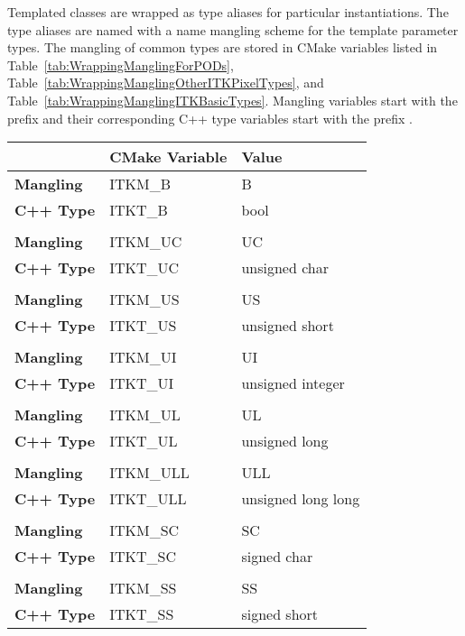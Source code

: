 Templated classes are wrapped as type aliases for particular instantiations. The
type aliases are named with a name mangling scheme for the template parameter
types. The mangling of common types are stored in CMake variables listed in
Table~\ref{tab:WrappingManglingForPODs},
Table~\ref{tab:WrappingManglingOtherITKPixelTypes}, and
Table~\ref{tab:WrappingManglingITKBasicTypes}. Mangling variables start with the prefix
 and their corresponding C++ type variables start with the
prefix .

\begin{table}
\begin{center}
\begin{tabular}{| l | l | l |}
\hline
& \textbf{CMake Variable} & \textbf{Value} \\
\hline
\hline
\textbf{Mangling} & ITKM\_B & B \\ \hline
\textbf{C++ Type} & ITKT\_B & bool \\ \hline
\\ \hline
\textbf{Mangling} & ITKM\_UC & UC \\ \hline
\textbf{C++ Type} & ITKT\_UC & unsigned char \\ \hline
\\ \hline
\textbf{Mangling} & ITKM\_US & US \\ \hline
\textbf{C++ Type} & ITKT\_US & unsigned short \\ \hline
\\ \hline
\textbf{Mangling} & ITKM\_UI & UI \\ \hline
\textbf{C++ Type} & ITKT\_UI & unsigned integer \\ \hline
\\ \hline
\textbf{Mangling} & ITKM\_UL & UL \\ \hline
\textbf{C++ Type} & ITKT\_UL & unsigned long \\ \hline
\\ \hline
\textbf{Mangling} & ITKM\_ULL & ULL \\ \hline
\textbf{C++ Type} & ITKT\_ULL & unsigned long long \\ \hline
\\ \hline
\textbf{Mangling} & ITKM\_SC & SC \\ \hline
\textbf{C++ Type} & ITKT\_SC & signed char \\ \hline
\\ \hline
\textbf{Mangling} & ITKM\_SS & SS \\ \hline
\textbf{C++ Type} & ITKT\_SS & signed short \\ \hline

\end{tabular}
\end{center}
\end{table}
